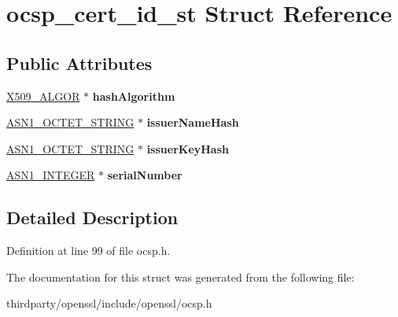 \hypertarget{structocsp__cert__id__st}{}\section{ocsp\+\_\+cert\+\_\+id\+\_\+st Struct Reference}
\label{structocsp__cert__id__st}
\subsection*{Public Attributes}
\begin{DoxyCompactItemize}
\item 
\mbox{\label{structocsp__cert__id__st_ab33f458f416845b6342c235d1afa63be}} 
\hyperlink{struct_x509__algor__st}{X509\+\_\+\+A\+L\+G\+OR} $\ast$ {\bfseries hash\+Algorithm}
\item 
\mbox{\label{structocsp__cert__id__st_a778948e91d91afbfd895f5a3860d8d67}} 
\hyperlink{structasn1__string__st}{A\+S\+N1\+\_\+\+O\+C\+T\+E\+T\+\_\+\+S\+T\+R\+I\+NG} $\ast$ {\bfseries issuer\+Name\+Hash}
\item 
\mbox{\label{structocsp__cert__id__st_a46eeca1e6b207fba6e0ca844f59d6838}} 
\hyperlink{structasn1__string__st}{A\+S\+N1\+\_\+\+O\+C\+T\+E\+T\+\_\+\+S\+T\+R\+I\+NG} $\ast$ {\bfseries issuer\+Key\+Hash}
\item 
\mbox{\label{structocsp__cert__id__st_a2385792d7888751bddbaa0dc150e9fbd}} 
\hyperlink{structasn1__string__st}{A\+S\+N1\+\_\+\+I\+N\+T\+E\+G\+ER} $\ast$ {\bfseries serial\+Number}
\end{DoxyCompactItemize}


\subsection{Detailed Description}


Definition at line 99 of file ocsp.\+h.



The documentation for this struct was generated from the following file\+:\begin{DoxyCompactItemize}
\item 
thirdparty/openssl/include/openssl/ocsp.\+h\end{DoxyCompactItemize}
